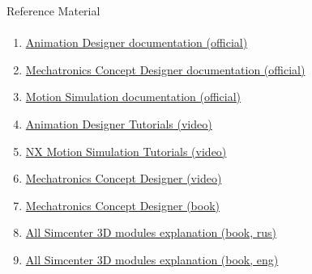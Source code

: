 \documentclass[aspectratio=169]{beamer}
\newcommand{\fbckg}[1]{\usebackgroundtemplate{\texttt{[image: \#1]}}}%
\begin{document}
\begin{frame}[t]{Reference Material}
\framesubtitle{}
\footnotesize
\begin{enumerate}
    \item \href{https://docs.sw.siemens.com/en-US/doc/209349590/PL20200605195244930.motion_designer/xid1334514}{Animation Designer documentation (official)}
    \item \href{https://docs.sw.siemens.com/en-US/doc/209349590/PL20200605195244930.mechatronics/id1101745}{Mechatronics Concept Designer documentation (official)}
    \item \href{https://docs.sw.siemens.com/en-US/doc/289054037/PL20201105153211099.motion/id563951}{Motion Simulation documentation (official)}
    \item \href{https://www.youtube.com/playlist?list=PLY2AphaX4SYcoXBPIjkHmph8JAtYcI90L}{Animation Designer Tutorials (video)}
    \item \href{https://www.youtube.com/playlist?list=PLY8N5WFx1MGAsxH7G49ey37QC_nFtQ72E}{NX Motion Simulation Tutorials (video)}
    \item \href{https://www.youtube.com/playlist?list=PLO4e9B3weuKLBmu6BEQkx3K7wE9GB_LL3}{Mechatronics Concept Designer (video)}
    \item \href{http://www2.me.rochester.edu/courses/ME204/nx_help/en_US/graphics/fileLibrary/nx/mechtronics/MCD_Quick_Start.pdf}{Mechatronics Concept Designer (book)}
    \item \href{https://www.clio-soft.ru/wp-content/uploads/2020/12/siemens-sw-simcenter-3d-solution-guide-e-book-russian.pdf}{All Simcenter 3D modules explanation (book, rus)}
    \item \href{https://www.ata-e.com/wp-content/uploads/2021/10/Siemens_Simcenter_3D_Solutions_Guide_e-Book_SET.pdf}{All Simcenter 3D modules explanation (book, eng)}
\end{enumerate}
    
\end{frame}

\fbckg{fibeamer/figs/last_page.png}
\frame[plain]{}
\end{document}
